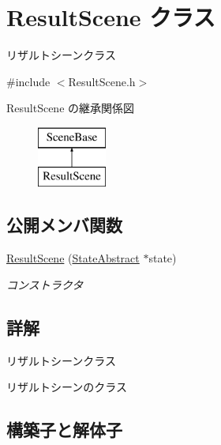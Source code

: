 \hypertarget{class_result_scene}{}\section{Result\+Scene クラス}
\label{class_result_scene}


リザルトシーンクラス  




{\ttfamily \#include $<$Result\+Scene.\+h$>$}

Result\+Scene の継承関係図\begin{figure}[H]
\begin{center}
\leavevmode
\includegraphics[height=2.000000cm]{class_result_scene}
\end{center}
\end{figure}
\subsection*{公開メンバ関数}
\begin{DoxyCompactItemize}
\item 
\mbox{\hyperlink{class_result_scene_aa3eb389e877dcf1062b42991903ca7c2}{Result\+Scene}} (\mbox{\hyperlink{class_scene_base_1_1_state_abstract}{State\+Abstract}} $\ast$state)
\begin{DoxyCompactList}\small\item\em コンストラクタ \end{DoxyCompactList}\end{DoxyCompactItemize}


\subsection{詳解}
リザルトシーンクラス 

リザルトシーンのクラス 

\subsection{構築子と解体子}
\mbox{\label{class_result_scene_aa3eb389e877dcf1062b42991903ca7c2}} 
